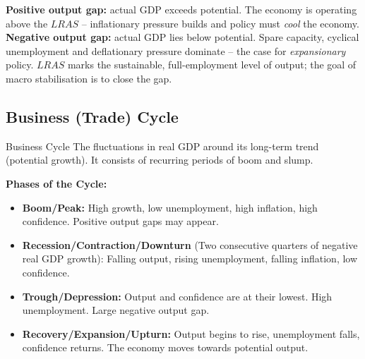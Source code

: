 \documentclass[11pt, a4paper, twoside]{book}
\begin{document}
\begin{diagrambox}
{%
}{%
\textbf{\color{CurveNavy}Positive output gap:} actual GDP exceeds potential.  The economy is operating above the $LRAS$ -- inflationary pressure builds and policy must \textit{cool} the economy.\quad
\textbf{\color{CurveNavy}Negative output gap:} actual GDP lies below potential.  Spare capacity, cyclical unemployment and deflationary pressure dominate -- the case for \textit{expansionary} policy.  $LRAS$ marks the sustainable, full-employment level of output; the goal of macro stabilisation is to close the gap.%
}
\end{diagrambox}

\subsection{Business (Trade) Cycle}

\begin{keyterm}{Business Cycle}
The fluctuations in real GDP around its long-term trend (potential growth). It consists of recurring periods of boom and slump.
\end{keyterm}

\textbf{Phases of the Cycle:}
\begin{itemize}
  \item \textbf{Boom/Peak:} High growth, low unemployment, high inflation, high confidence. Positive output gaps may appear.
  \item \textbf{Recession/Contraction/Downturn} (Two consecutive quarters of negative real GDP growth): Falling output, rising unemployment, falling inflation, low confidence.
  \item \textbf{Trough/Depression:} Output and confidence are at their lowest. High unemployment. Large negative output gap.
  \item \textbf{Recovery/Expansion/Upturn:} Output begins to rise, unemployment falls, confidence returns. The economy moves towards potential output.
\end{itemize}
\end{document}
